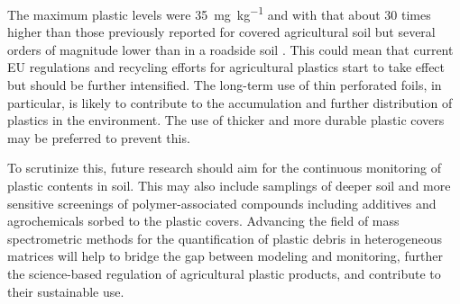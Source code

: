 The maximum plastic levels were \SI{35}{\milli\gram\per\kilo\gram} and with that about 30 times higher than those previously reported for covered agricultural soil \citep{BuksGlobal2020} but several orders of magnitude lower than in a roadside soil \citep{DierkesQuantification2019}. This could mean that current EU regulations \citep{EN13655Plastics2018} and recycling efforts for agricultural plastics start to take effect but should be further intensified. The long-term use of thin perforated foils, in particular, is likely to contribute to the accumulation and further distribution of plastics in the environment. The use of thicker and more durable plastic covers may be preferred to prevent this.

To scrutinize this, future research should aim for the continuous monitoring of plastic contents in soil. This may also include samplings of deeper soil and more sensitive screenings of polymer-associated compounds including additives and agrochemicals sorbed to the plastic covers.
Advancing the field of mass spectrometric methods for the quantification of plastic debris in heterogeneous matrices will help to bridge the gap between modeling and monitoring, further the science-based regulation of agricultural plastic products, and contribute to their sustainable use.
